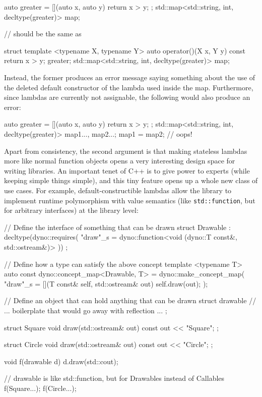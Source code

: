 \documentclass{wg21}
\newcommand{\cc}[1]{\texttt{#1}}
\begin{document}
\begin{cpp}
auto greater = [](auto x, auto y) { return x > y; };
std::map<std::string, int, decltype(greater)> map;

// should be the same as

struct {
  template <typename X, typename Y>
  auto operator()(X x, Y y) const { return x > y; }
} greater;
std::map<std::string, int, decltype(greater)> map;
\end{cpp}

Instead, the former produces an error message saying something about the use
of the deleted default constructor of the lambda used inside the map. Furthermore,
since lambdas are currently not assignable, the following would also produce an
error:

\begin{cpp}
auto greater = [](auto x, auto y) { return x > y; };
std::map<std::string, int, decltype(greater)> map1{...}, map2{...};
map1 = map2; // oops!
\end{cpp}

Apart from consistency, the second argument is that making stateless lambdas
more like normal function objects opens a very interesting design space for
writing libraries. An important tenet of C++ is to give power to experts
(while keeping simple things simple), and this tiny feature opens up a whole
new class of use cases. For example, default-constructible lambdas allow the
\cite{Dyno} library to implement runtime polymorphism with value semantics
(like \cc{std::function}, but for arbitrary interfaces) at the library level:

\begin{cpp}
// Define the interface of something that can be drawn
struct Drawable : decltype(dyno::requires(
  "draw"_s = dyno::function<void (dyno::T const&, std::ostream&)>
)) { };

// Define how a type can satisfy the above concept
template <typename T>
auto const dyno::concept_map<Drawable, T> = dyno::make_concept_map(
  "draw"_s = [](T const& self, std::ostream& out) { self.draw(out); }
);

// Define an object that can hold anything that can be drawn
struct drawable {
  // ... boilerplate that would go away with reflection ...
};

struct Square {
  void draw(std::ostream& out) const { out << "Square"; }
};

struct Circle {
  void draw(std::ostream& out) const { out << "Circle"; }
};

void f(drawable d) {
  d.draw(std::cout);
}

// drawable is like std::function, but for Drawables instead of Callables
f(Square{...});
f(Circle{...});
\end{cpp}
\end{document}
